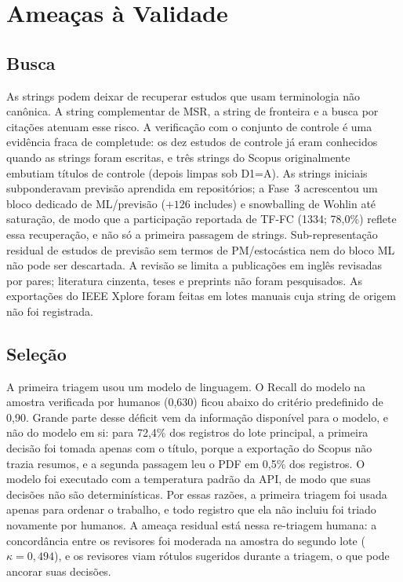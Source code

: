 \documentclass[preprint,12pt,authoryear=false]{elsarticle}
\newcommand{\FC}{TF-FC}
\begin{document}
\section{Ameaças à Validade}\label{sec:threats}

\subsection{Busca}\label{sec:threats-search}

As strings podem deixar de recuperar estudos que usam terminologia não canônica. A string complementar de MSR, a string de fronteira e a busca por citações atenuam esse risco. A verificação com o conjunto de controle é uma evidência fraca de completude: os dez estudos de controle já eram conhecidos quando as strings foram escritas, e três strings do Scopus originalmente embutiam títulos de controle (depois limpas sob D1=A). As strings iniciais subponderavam previsão aprendida em repositórios; a Fase~3 acrescentou um bloco dedicado de ML/previsão ($+126$ includes) e snowballing de Wohlin até saturação, de modo que a participação reportada de \FC{} (1334; 78,0\%) reflete essa recuperação, e não só a primeira passagem de strings. Sub-representação residual de estudos de previsão sem termos de PM/estocástica nem do bloco ML não pode ser descartada. A revisão se limita a publicações em inglês revisadas por pares; literatura cinzenta, teses e preprints não foram pesquisados. As exportações do IEEE Xplore foram feitas em lotes manuais cuja string de origem não foi registrada.

\subsection{Seleção}

A primeira triagem usou um modelo de linguagem. O Recall do modelo na amostra verificada por humanos (0,630) ficou abaixo do critério predefinido de 0,90. Grande parte desse déficit vem da informação disponível para o modelo, e não do modelo em si: para 72,4\% dos registros do lote principal, a primeira decisão foi tomada apenas com o título, porque a exportação do Scopus não trazia resumos, e a segunda passagem leu o PDF em 0,5\% dos registros. O modelo foi executado com a temperatura padrão da API, de modo que suas decisões não são determinísticas. Por essas razões, a primeira triagem foi usada apenas para ordenar o trabalho, e todo registro que ela não incluiu foi triado novamente por humanos. A ameaça residual está nessa re-triagem humana: a concordância entre os revisores foi moderada na amostra do segundo lote ($\kappa = 0{,}494$), e os revisores viam rótulos sugeridos durante a triagem, o que pode ancorar suas decisões.
\end{document}
